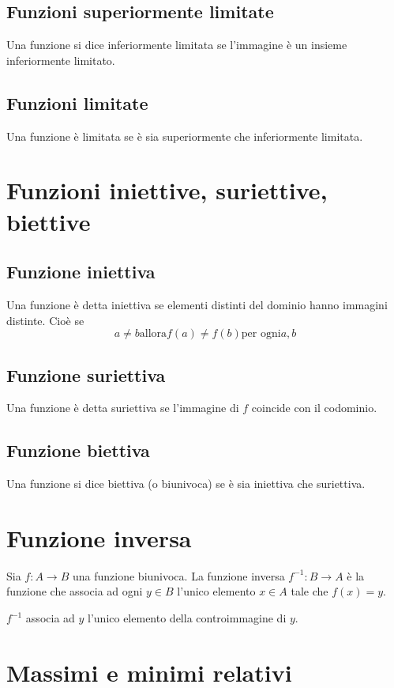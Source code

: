\subsection{Funzioni superiormente limitate}
Una funzione si dice inferiormente limitata se l'immagine è un insieme inferiormente limitato.

\subsection{Funzioni limitate}
Una funzione è limitata se è sia superiormente che inferiormente limitata.


\section{Funzioni iniettive, suriettive, biettive}

\subsection{Funzione iniettiva}
Una funzione è detta iniettiva se elementi distinti del dominio hanno immagini distinte. Cioè se $$ a \neq b \text{allora} f(a) \neq f(b) \text{per ogni} a,b$$

\subsection{Funzione suriettiva}
Una funzione è detta suriettiva se l'immagine di $f$ coincide con il codominio.

\subsection{Funzione biettiva}
Una funzione si dice biettiva (o biunivoca) se è sia iniettiva che suriettiva.

\section{Funzione inversa}
Sia $f:A \rightarrow B$ una funzione biunivoca. La funzione inversa $f^{-1}:B \rightarrow A$ è la funzione che associa ad ogni $y \in B$ l'unico elemento $x \in A$ tale che $f(x) = y$.

\begin{tip}
$f^{-1}$ associa ad $y$ l'unico elemento della controimmagine di $y$.
\end{tip}

\section{Massimi e minimi relativi}

